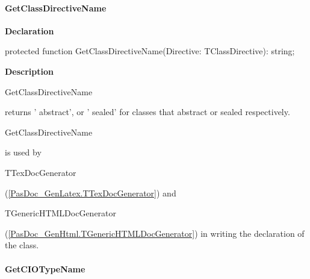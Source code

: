 \documentclass{report}
\newif\ifpdf
\begin{document}
\paragraph*{GetClassDirectiveName}\hspace*{\fill}

\label{PasDoc_Gen.TDocGenerator-GetClassDirectiveName}
\begin{list}{}{
\setlength{\itemindent}{0cm}
\setlength{\listparindent}{0cm}
\setlength{\leftmargin}{\evensidemargin}
\addtolength{\leftmargin}{\tmplength}
\settowidth{\labelsep}{X}
\addtolength{\leftmargin}{\labelsep}
\setlength{\labelwidth}{\tmplength}
}
\item[\textbf{Declaration}\hfill]
\ifpdf
\begin{flushleft}
\fi
\begin{ttfamily}
protected function GetClassDirectiveName(Directive: TClassDirective): string;\end{ttfamily}

\ifpdf
\end{flushleft}
\fi

\par
\item[\textbf{Description}]
\begin{ttfamily}GetClassDirectiveName\end{ttfamily} returns ' abstract', or ' sealed' for classes that abstract or sealed respectively. \begin{ttfamily}GetClassDirectiveName\end{ttfamily} is used by \begin{ttfamily}TTexDocGenerator\end{ttfamily}(\ref{PasDoc_GenLatex.TTexDocGenerator}) and \begin{ttfamily}TGenericHTMLDocGenerator\end{ttfamily}(\ref{PasDoc_GenHtml.TGenericHTMLDocGenerator}) in writing the declaration of the class.

\end{list}
\paragraph*{GetCIOTypeName}\hspace*{\fill}
\end{document}
